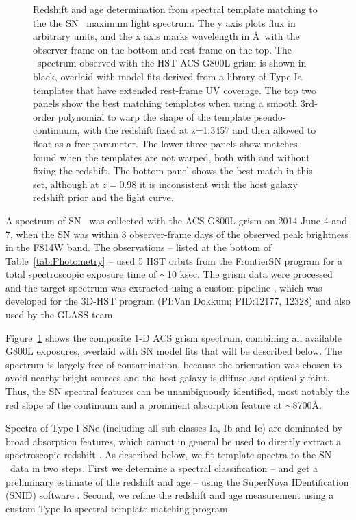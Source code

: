 \begin{figure}
\begin{center}
\caption{  \label{fig:SpecFit}
Redshift and age determination from spectral template matching to the
the SN \tomas\ maximum light spectrum.  The y axis plots flux in
arbitrary units, and the x axis marks wavelength in \AA\ with the
observer-frame on the bottom and rest-frame on the top.  The \tomas\
spectrum observed with the HST ACS G800L grism is shown in black,
overlaid with model fits derived from a library of Type Ia templates
that have extended rest-frame UV coverage.  The top two panels show
the best matching templates when using a smooth 3rd-order polynomial
to warp the shape of the template pseudo-continuum, with the redshift
fixed at z=1.3457 and then allowed to float as a free parameter.  The
lower three panels show matches found when the templates are not
warped, both with and without fixing the redshift.  The bottom panel
shows the best match in this set, although at $z=0.98$ it is
inconsistent with the host galaxy redshift prior and the light curve.
}
\end{center}
\end{figure}


A spectrum of SN \tomas\ was collected with the ACS G800L grism on
2014 June 4 and 7, when the SN was within 3 observer-frame
days of the observed peak brightness in the F814W band.  The
observations -- listed at the bottom of Table~\ref{tab:Photometry} --
used 5 HST orbits from the FrontierSN program for a total
spectroscopic exposure time of $\sim$10 ksec.  The grism data were
processed and the target spectrum was extracted using a custom
pipeline \citep{Brammer:2012}, which was developed for the 3D-HST
program (PI:Van Dokkum; PID:12177, 12328) and also used by the GLASS
team.

Figure~\ref{fig:SpecFit} shows the composite 1-D ACS grism spectrum,
combining all available G800L exposures, overlaid with SN model fits
that will be described below.  The spectrum is largely free of
contamination, because the orientation was chosen to avoid nearby
bright sources and the host galaxy is diffuse and optically faint.
Thus, the SN spectral features can be unambiguously identified, most
notably the red slope of the continuum and a prominent absorption
feature at $\sim$8700\AA.  

Spectra of Type I SNe (including all sub-classes Ia, Ib and Ic) are
dominated by broad absorption features, which cannot in general be
used to directly extract a spectroscopic redshift \citep[see
e.g.][]{Filippenko:1997}.  As described below, we fit template spectra
to the SN \tomas\ data in two steps.  First we determine a spectral
classification -- and get a preliminary estimate of the redshift and
age -- using the SuperNova IDentification (SNID)
software \citep{Blondin:2007}.  Second, we refine the redshift and age
measurement using a custom Type Ia spectral template matching program.

